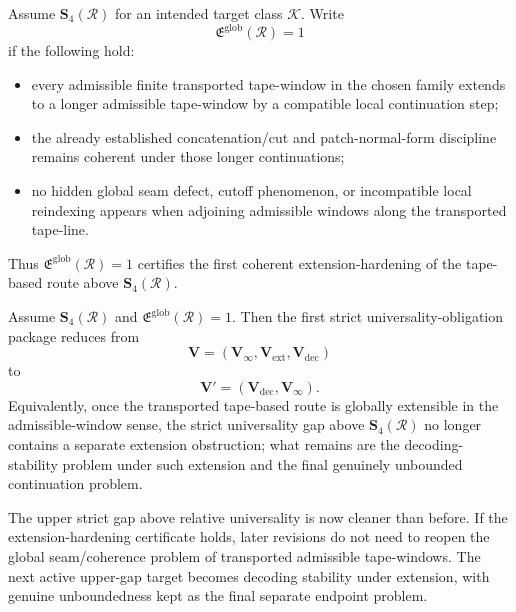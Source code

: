 \begin{definition}
Assume \(\mathbf S_4(\mathcal R)\) for an intended target class \(\mathcal K\).
Write
\[
\mathfrak E^{\mathrm{glob}}(\mathcal R)=1
\]
if the following hold:
\begin{itemize}[leftmargin=2em]
 \item every admissible finite transported tape-window in the chosen family extends to a longer admissible tape-window by a compatible local continuation step;
 \item the already established concatenation/cut and patch-normal-form discipline remains coherent under those longer continuations;
 \item no hidden global seam defect, cutoff phenomenon, or incompatible local reindexing appears when adjoining admissible windows along the transported tape-line.
\end{itemize}
Thus \(\mathfrak E^{\mathrm{glob}}(\mathcal R)=1\) certifies the first coherent extension-hardening of the tape-based route above \(\mathbf S_4(\mathcal R)\).
\end{definition}

\begin{proposition}
Assume \(\mathbf S_4(\mathcal R)\) and \(\mathfrak E^{\mathrm{glob}}(\mathcal R)=1\). Then the first strict universality-obligation package reduces from
\[
\mathbf V=(\mathbf V_\infty,\mathbf V_{\mathrm{ext}},\mathbf V_{\mathrm{dec}})
\]
to
\[
\mathbf V'=(\mathbf V_{\mathrm{dec}},\mathbf V_\infty).
\]
Equivalently, once the transported tape-based route is globally extensible in the admissible-window sense, the strict universality gap above \(\mathbf S_4(\mathcal R)\) no longer contains a separate extension obstruction; what remains are the decoding-stability problem under such extension and the final genuinely unbounded continuation problem.
\end{proposition}

\begin{corollary}
The upper strict gap above relative universality is now cleaner than before. If the extension-hardening certificate holds, later revisions do not need to reopen the global seam/coherence problem of transported admissible tape-windows. The next active upper-gap target becomes decoding stability under extension, with genuine unboundedness kept as the final separate endpoint problem.
\end{corollary}


